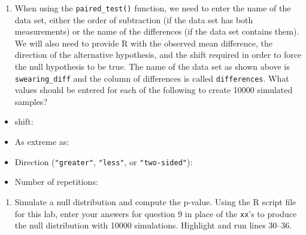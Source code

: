 \documentclass[
]{report}
\providecommand{\tightlist}{%
  \setlength{\itemsep}{0pt}\setlength{\parskip}{0pt}}
\begin{document}
\begin{enumerate}
\def\labelenumi{\arabic{enumi}.}
\setcounter{enumi}{8}
\tightlist
\item
  When using the \texttt{paired\_test()} function, we need to enter the name of the data set, either the order of subtraction (if the data set has both measurements) or the name of the differences (if the data set contains them). We will also need to provide R with the observed mean difference, the direction of the alternative hypothesis, and the shift required in order to force the null hypothesis to be true. The name of the data set as shown above is \texttt{swearing\_diff} and the column of differences is called \texttt{differences}. What values should be entered for each of the following to create 10000 simulated samples?
\end{enumerate}

\vspace{1mm}

\begin{itemize}
\tightlist
\item
  shift:
\end{itemize}

\vspace{.1in}

\begin{itemize}
\tightlist
\item
  As extreme as:
\end{itemize}

\vspace{.1in}

\begin{itemize}
\tightlist
\item
  Direction (\texttt{"greater"}, \texttt{"less"}, or \texttt{"two-sided"}):
\end{itemize}

\vspace{.1in}

\begin{itemize}
\tightlist
\item
  Number of repetitions:
\end{itemize}

\vspace{.1in}

\begin{enumerate}
\def\labelenumi{\arabic{enumi}.}
\setcounter{enumi}{9}
\tightlist
\item
  Simulate a null distribution and compute the p-value. Using the R script file for this lab, enter your answers for question 9 in place of the \texttt{xx}'s to produce the null distribution with 10000 simulations. Highlight and run lines 30--36.
\end{enumerate}
\end{document}

